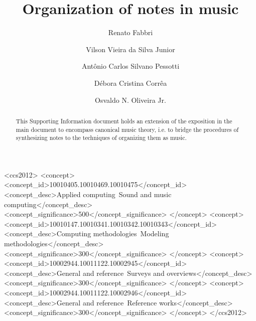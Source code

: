 \documentclass[format=acmsmall, review=false, screen=true]{acmart}
\begin{document}
\title[Notes in music]{Organization of notes in music}  
\author{Renato Fabbri}
\author{Vilson Vieira da Silva Junior}
\author{Ant\^onio Carlos Silvano Pessotti}
\author{D\'ebora Cristina Corr\^ea}
\author{Osvaldo N. Oliveira Jr.}

\begin{abstract}
  This Supporting Information document holds an extension of the exposition in the main document to encompass canonical music theory, i.e. to bridge the procedures of synthesizing notes to the techniques of organizing them as music.
\end{abstract}

%
%
\begin{CCSXML}
  <ccs2012>
    <concept>
      <concept_id>10010405.10010469.10010475</concept_id>
      <concept_desc>Applied computing~Sound and music computing</concept_desc>
      <concept_significance>500</concept_significance>
    </concept>
    <concept>
      <concept_id>10010147.10010341.10010342.10010343</concept_id>
      <concept_desc>Computing methodologies~Modeling methodologies</concept_desc>
      <concept_significance>300</concept_significance>
    </concept>
    <concept>
      <concept_id>10002944.10011122.10002945</concept_id>
      <concept_desc>General and reference~Surveys and overviews</concept_desc>
      <concept_significance>300</concept_significance>
    </concept>
    <concept>
      <concept_id>10002944.10011122.10002946</concept_id>
      <concept_desc>General and reference~Reference works</concept_desc>
      <concept_significance>300</concept_significance>
    </concept>
  </ccs2012>
\end{CCSXML}
\end{document}
